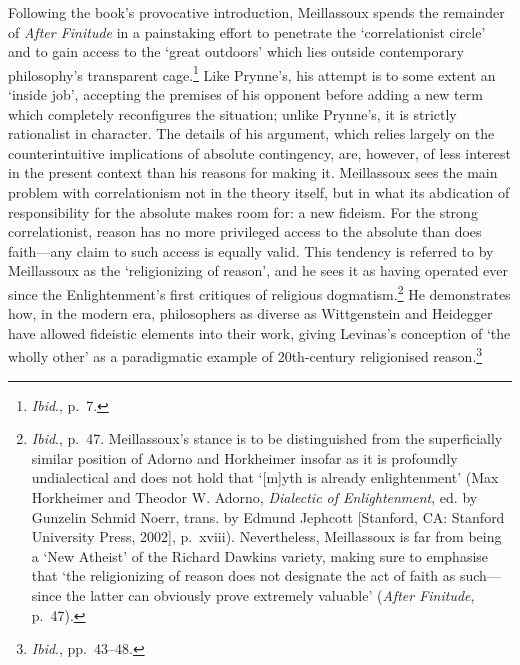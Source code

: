 \documentclass[]{article}
\begin{document}
Following the book's provocative introduction, Meillassoux spends the
remainder of \emph{After Finitude} in a painstaking effort to penetrate
the `correlationist circle' and to gain access to the `great outdoors'
which lies outside contemporary philosophy's transparent cage.\footnote{\emph{Ibid}.,
  p.~7.} Like Prynne's, his attempt is to some extent an `inside job',
accepting the premises of his opponent before adding a new term which
completely reconfigures the situation; unlike Prynne's, it is strictly
rationalist in character. The details of his argument, which relies
largely on the counterintuitive implications of absolute contingency,
are, however, of less interest in the present context than his reasons
for making it. Meillassoux sees the main problem with correlationism not
in the theory itself, but in what its abdication of responsibility for
the absolute makes room for: a new fideism. For the strong
correlationist, reason has no more privileged access to the absolute
than does faith---any claim to such access is equally valid. This
tendency is referred to by Meillassoux as the `religionizing of reason',
and he sees it as having operated ever since the Enlightenment's first
critiques of religious dogmatism.\footnote{\emph{Ibid}., p.~47.
  Meillassoux's stance is to be distinguished from the superficially
  similar position of Adorno and Horkheimer insofar as it is profoundly
  undialectical and does not hold that `{[}m{]}yth is already
  enlightenment' (Max Horkheimer and Theodor W. Adorno, \emph{Dialectic
  of Enlightenment}, ed. by Gunzelin Schmid Noerr, trans. by Edmund
  Jephcott {[}Stanford, CA: Stanford University Press, 2002{]},
  p.~xviii). Nevertheless, Meillassoux is far from being a `New Atheist'
  of the Richard Dawkins variety, making sure to emphasise that `the
  religionizing of reason does not designate the act of faith as
  such---since the latter can obviously prove extremely valuable'
  (\emph{After Finitude}, p.~47).} He demonstrates how, in the modern
era, philosophers as diverse as Wittgenstein and Heidegger have allowed
fideistic elements into their work, giving Levinas's conception of `the
wholly other' as a paradigmatic example of 20th-century religionised
reason.\footnote{\emph{Ibid}., pp.~43--48.}
\end{document}
